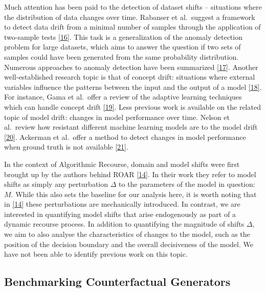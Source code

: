 \documentclass[conference,final,]{IEEEtran}
\theoremstyle{definition}
\theoremstyle{definition}
\theoremstyle{definition}
\theoremstyle{definition}
\theoremstyle{remark}
\begin{document}
Much attention has been paid to the detection of dataset shifts -- situations where the distribution of data changes over time. Rabanser et al.~suggest a framework to detect data drift from a minimal number of samples through the application of two-sample tests \protect\hyperlink{ref-rabanser2019failing}{{[}16{]}}. This task is a generalization of the anomaly detection problem for large datasets, which aims to answer the question if two sets of samples could have been generated from the same probability distribution. Numerous approaches to anomaly detection have been summarized \protect\hyperlink{ref-chandola2009anomaly}{{[}17{]}}. Another well-established research topic is that of concept drift: situations where external variables influence the patterns between the input and the output of a model \protect\hyperlink{ref-widmer1996learning}{{[}18{]}}. For instance, Gama et al.~offer a review of the adaptive learning techniques which can handle concept drift \protect\hyperlink{ref-gama2014survey}{{[}19{]}}. Less previous work is available on the related topic of model drift: changes in model performance over time. Nelson et al.~review how resistant different machine learning models are to the model drift \protect\hyperlink{ref-nelson2015evaluating}{{[}20{]}}. Ackerman et al.~offer a method to detect changes in model performance when ground truth is not available \protect\hyperlink{ref-ackerman2021machine}{{[}21{]}}.

In the context of Algorithmic Recourse, domain and model shifts were first brought up by the authors behind ROAR \protect\hyperlink{ref-upadhyay2021robust}{{[}14{]}}. In their work they refer to model shifts as simply any perturbation \(\Delta\) to the parameters of the model in question: \(M\). While this also sets the baseline for our analysis here, it is worth noting that in \protect\hyperlink{ref-upadhyay2021robust}{{[}14{]}} these perturbations are mechanically introduced. In contrast, we are interested in quantifying model shifts that arise endogenously as part of a dynamic recourse process. In addition to quantifying the magnitude of shifts \(\Delta\), we aim to also analyse the characteristics of changes to the model, such as the position of the decision boundary and the overall decisiveness of the model. We have not been able to identify previous work on this topic.

\hypertarget{related-benchmark}{%
\subsection{Benchmarking Counterfactual Generators}\label{related-benchmark}}
\end{document}
